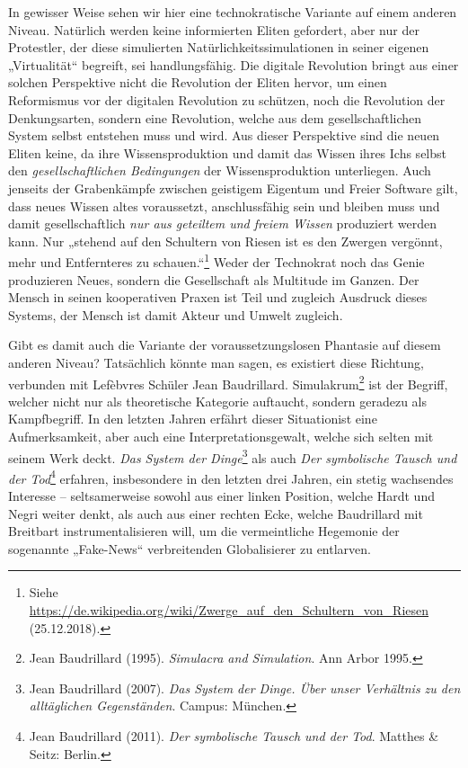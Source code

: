 \documentclass[12pt,a4paper]{article}
\begin{document}
In gewisser Weise sehen wir hier eine technokratische Variante auf einem
anderen Niveau.  Natürlich werden keine informierten Eliten gefordert, aber
nur der Protestler, der diese simulierten Natürlichkeitssimulationen in seiner
eigenen „Virtualität“ begreift, sei handlungsfähig.  Die digitale Revolution
bringt aus einer solchen Perspektive nicht die Revolution der Eliten hervor,
um einen Reformismus vor der digitalen Revolution zu schützen, noch die
Revolution der Denkungsarten, sondern eine Revolution, welche aus dem
gesellschaftlichen System selbst entstehen muss und wird.  Aus dieser
Perspektive sind die neuen Eliten keine, da ihre Wissensproduktion und damit
das Wissen ihres Ichs selbst den \emph{gesellschaftlichen Bedingungen} der
Wissensproduktion unterliegen.  Auch jenseits der Grabenkämpfe zwischen
geistigem Eigentum und Freier Software gilt, dass neues Wissen altes
voraussetzt, anschlussfähig sein und bleiben muss und damit gesellschaftlich
\emph{nur aus geteiltem und freiem Wissen} produziert werden kann. Nur
„stehend auf den Schultern von Riesen ist es den Zwergen vergönnt, mehr und
Entfernteres zu schauen.“\footnote{Siehe
  \url{https://de.wikipedia.org/wiki/Zwerge_auf_den_Schultern_von_Riesen}
  (25.12.2018).}  Weder der Technokrat noch das Genie produzieren Neues,
sondern die Gesellschaft als Multitude im Ganzen. Der Mensch in seinen
kooperativen Praxen ist Teil und zugleich Ausdruck dieses Systems, der Mensch
ist damit Akteur und Umwelt zugleich.

Gibt es damit auch die Variante der voraussetzungslosen Phantasie auf diesem
anderen Niveau?  Tatsächlich könnte man sagen, es existiert diese Richtung,
verbunden mit Lefèbvres Schüler Jean Baudrillard. Simulakrum\footnote{Jean
  Baudrillard (1995). \emph{Simulacra and Simulation}. Ann Arbor 1995.} ist
der Begriff, welcher nicht nur als theoretische Kategorie auftaucht, sondern
geradezu als Kampfbegriff. In den letzten Jahren erfährt dieser Situationist
eine Aufmerksamkeit, aber auch eine Interpretationsgewalt, welche sich selten
mit seinem Werk deckt.  \emph{Das System der Dinge}\footnote{Jean Baudrillard
  (2007). \emph{Das System der Dinge. Über unser Verhältnis zu den
    alltäglichen Gegenständen}. Campus: München.} als auch \emph{Der
  symbolische Tausch und der Tod}\footnote{Jean Baudrillard (2011). \emph{Der
    symbolische Tausch und der Tod}. Matthes \& Seitz: Berlin.} erfahren,
insbesondere in den letzten drei Jahren, ein stetig wachsendes Interesse --
seltsamerweise sowohl aus einer linken Position, welche Hardt und Negri weiter
denkt, als auch aus einer rechten Ecke, welche Baudrillard mit Breitbart 
instrumentalisieren will, um die vermeintliche Hegemonie der sogenannte
„Fake-News“ verbreitenden Globalisierer zu entlarven.
\end{document}
